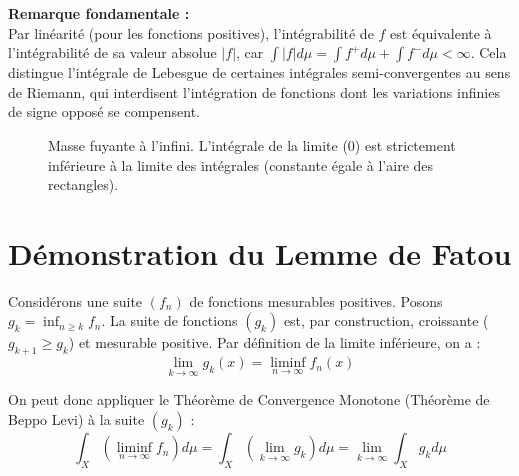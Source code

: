 \documentclass[11pt,a4paper]{article}
\begin{document}
\textbf{Remarque fondamentale :}\\
Par linéarité (pour les fonctions positives), l'intégrabilité de $f$ est équivalente à l'intégrabilité de sa valeur absolue $|f|$, car $\int |f| d\mu = \int f^+ d\mu + \int f^- d\mu < \infty$. Cela distingue l'intégrale de Lebesgue de certaines intégrales semi-convergentes au sens de Riemann, qui interdisent l'intégration de fonctions dont les variations infinies de signe opposé se compensent.

\begin{figure}[h]
\centering
{}
\caption{Masse fuyante à l'infini. L'intégrale de la limite (0) est strictement inférieure à la limite des intégrales (constante égale à l'aire des rectangles).}
\end{figure}

\section{Démonstration du Lemme de Fatou}

Considérons une suite $(f_n)$ de fonctions mesurables positives.
Posons $g_k = \inf_{n \ge k} f_n$. La suite de fonctions $(g_k)$ est, par construction, croissante ($g_{k+1} \ge g_k$) et mesurable positive.
Par définition de la limite inférieure, on a :
$$ \lim_{k \to \infty} g_k(x) = \liminf_{n \to \infty} f_n(x) $$

On peut donc appliquer le Théorème de Convergence Monotone (Théorème de Beppo Levi) à la suite $(g_k)$ :
$$ \int_X \left( \liminf_{n \to \infty} f_n \right) d\mu = \int_X \left( \lim_{k \to \infty} g_k \right) d\mu = \lim_{k \to \infty} \int_X g_k d\mu $$
\end{document}
